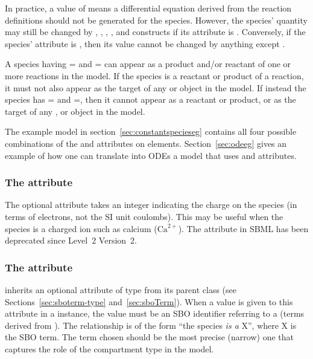 In practice, a  value of  means
a differential equation derived from the reaction definitions
should not be generated for the species.  However, the species'
quantity may still be changed by \AssignmentRule, \RateRule,
\AlgebraicRule, \Event, and \InitialAssignment constructs if its
 attribute is .  Conversely, if the
species'  attribute is , then its value
cannot be changed by anything except \InitialAssignment.

A species having = and
= can appear as a product and/or
reactant of one or more reactions in the model.  If the species is
a reactant or product of a reaction, it must not also appear as
the target of any \AssignmentRule or \RateRule object in the
model.  If instead the species \color{black} has
= and
=, then it cannot appear as a reactant
or product, or as the target of any \AssignmentRule, \RateRule or
\EventAssignment object in the model.


The example model in section~\ref{sec:constantspecieseg} contains
all four possible combinations of the 
and  attributes on  elements.
Section~\ref{sec:odeeg} gives an example of how one can translate
into ODEs a model that uses  and
 attributes.


\subsubsection{The  attribute}
\label{sec:charge}

The optional attribute  takes an integer
indicating the charge on the species (in terms of electrons, not
the SI unit coulombs). This may be useful when the species is a
charged ion such as calcium ($\text{Ca}^{2+}$).  The
 attribute in SBML has been deprecated
since Level~2 Version~2.


\subsubsection{The  attribute}
\label{sec:species-sboterm}

\Species inherits an optional  attribute
of type  from its parent class \SBase (see
Sections~\ref{sec:sboterm-type} and~\ref{sec:sboTerm}).  When a
value is given to this attribute in a \Species instance,
the value must be an SBO identifier referring to a  (\ie terms derived from \sbomaterialentity).
The relationship is of the form ``the species \emph{is a} X'',
where X is the SBO term.  The term chosen should be the most
precise (narrow) one that captures the role of the compartment
type in the model.


